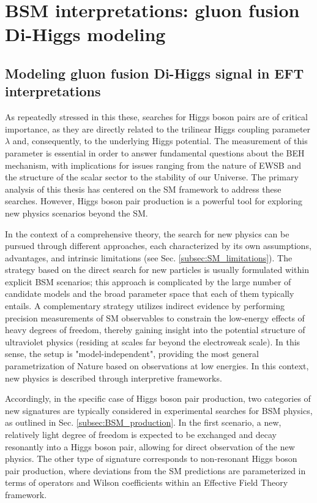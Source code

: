 \part{BSM interpretations: gluon fusion Di-Higgs modeling}

\chapter{Modeling gluon fusion Di-Higgs signal in EFT interpretations}
\label{ch:eft_modeling}
As repeatedly stressed in this these, searches for Higgs boson pairs are of critical importance, as they are directly related to the trilinear Higgs coupling parameter $\lambda$ and, consequently, to the underlying Higgs potential. The measurement of this parameter is essential in order to answer fundamental questions about the BEH mechanism, with implications for issues ranging from the nature of EWSB and the structure of the scalar sector to the stability of our Universe. The primary analysis of this thesis has centered on the SM framework to address these searches. However, Higgs boson pair production is a powerful tool for exploring new physics scenarios beyond the SM.

In the context of a comprehensive theory, the search for new physics can be pursued through different approaches, each characterized by its own assumptions, advantages, and intrinsic limitations (see Sec. \ref{subsec:SM_limitations}). The strategy based on the direct search for new particles is usually formulated within explicit BSM scenarios; this approach is complicated by the large number of candidate models and the broad parameter space that each of them typically entails. A complementary strategy utilizes indirect evidence by performing precision measurements of SM observables to constrain the low-energy effects of heavy degrees of freedom, thereby gaining insight into the potential structure of ultraviolet physics (residing at scales far beyond the electroweak scale). In this sense, the setup is "model-independent", providing the most general parametrization of Nature based on observations at low energies. In this context, new physics is described through interpretive frameworks.

Accordingly, in the specific case of Higgs boson pair production, two categories of new signatures are typically considered in experimental searches for BSM physics, as outlined in Sec. \ref{subsec:BSM_production}. In the first scenario, a new, relatively light degree of freedom is expected to be exchanged and decay resonantly into a Higgs boson pair, allowing for direct observation of the new physics. The other type of signature corresponds to non-resonant Higgs boson pair production, where deviations from the SM predictions are parameterized in terms of operators and Wilson coefficients within an Effective Field Theory framework.

